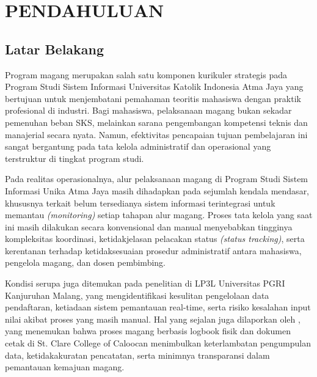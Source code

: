 %

\chapter{PENDAHULUAN}

\section{Latar Belakang}

Program magang merupakan salah satu komponen kurikuler strategis pada Program Studi 
Sistem Informasi Universitas Katolik Indonesia Atma Jaya yang bertujuan untuk 
menjembatani pemahaman teoritis mahasiswa dengan praktik profesional di industri. 
Bagi mahasiswa, pelaksanaan magang bukan sekadar pemenuhan beban SKS, melainkan sarana 
pengembangan kompetensi teknis dan manajerial secara nyata. Namun, efektivitas 
pencapaian tujuan pembelajaran ini sangat bergantung pada tata kelola administratif dan 
operasional yang terstruktur di tingkat program studi.

Pada realitas operasionalnya, alur pelaksanaan magang di Program Studi Sistem Informasi 
Unika Atma Jaya masih dihadapkan pada sejumlah kendala mendasar, khususnya terkait belum 
tersedianya sistem informasi terintegrasi untuk memantau \textit{(monitoring)} setiap tahapan 
alur magang. Proses tata kelola yang saat ini masih dilakukan secara konvensional dan 
manual menyebabkan tingginya kompleksitas koordinasi, ketidakjelasan pelacakan status 
\textit{(status tracking)}, serta kerentanan terhadap ketidaksesuaian prosedur administratif 
antara mahasiswa, pengelola magang, dan dosen pembimbing.

Kondisi serupa juga ditemukan pada penelitian \cite{Rosanti2025} di LP3L Universitas PGRI 
Kanjuruhan Malang, yang mengidentifikasi kesulitan pengelolaan data pendaftaran, ketiadaan 
sistem pemantauan real-time, serta risiko kesalahan input nilai akibat proses yang 
masih manual. Hal yang sejalan juga dilaporkan oleh \cite{Asehan2026}, yang menemukan 
bahwa proses magang berbasis logbook fisik dan dokumen cetak di St. Clare College of 
Caloocan menimbulkan keterlambatan pengumpulan data, ketidakakuratan pencatatan, serta 
minimnya transparansi dalam pemantauan kemajuan magang.

